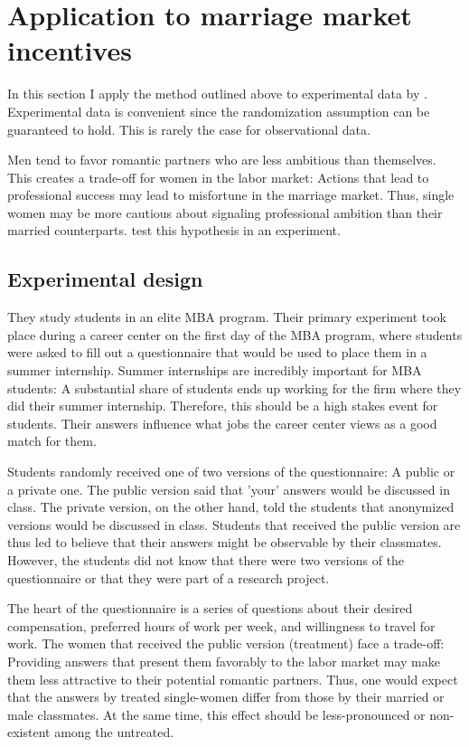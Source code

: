 \documentclass[aodsor,preprint]{imsart}
\numberwithin{equation}{section}
\theoremstyle{plain}
\begin{document}
\section{Application to marriage market incentives} \label{application}

In this section I apply the method outlined above to experimental data by \cite{Bursztyn_2017}. Experimental data is convenient since the randomization assumption can be guaranteed to hold. This is rarely the case for observational data. 

Men tend to favor romantic partners who are less ambitious than themselves. This creates a trade-off for women in the labor market: Actions that lead to professional success may lead to misfortune in the marriage market. Thus, single women may be more cautious about signaling professional ambition than their married counterparts. \cite{Bursztyn_2017} test this hypothesis in an experiment.

\subsection{Experimental design}
They study students in an elite MBA program. Their primary experiment took place during a career center on the first day of the MBA program, where students were asked to fill out a questionnaire that would be used to place them in a summer internship. Summer internships are incredibly important for MBA students: A substantial share of students ends up working for the firm where they did their summer internship. Therefore, this should be a high stakes event for students. Their answers influence what jobs the career center views as a good match for them.

Students randomly received one of two versions of the questionnaire: A public or a private one. The public version said that 'your' answers would be discussed in class. The private version, on the other hand, told the students that anonymized versions would be discussed in class. Students that received the public version are thus led to believe that their answers might be observable by their classmates. However, the students did not know that there were two versions of the questionnaire or that they were part of a research project.

The heart of the questionnaire is a series of questions about their desired compensation, preferred hours of work per week, and willingness to travel for work. The women that received the public version (treatment) face a trade-off: Providing answers that present them favorably to the labor market may make them less attractive to their potential romantic partners. Thus, one would expect that the answers by treated single-women differ from those by their married or male classmates. At the same time, this effect should be less-pronounced or non-existent among the untreated.
\end{document}
